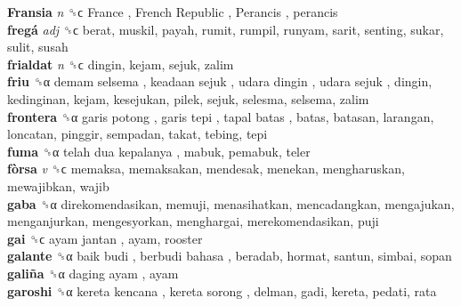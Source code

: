 \textbf{Fransia} \emph{n}  ␝ϲ   France ,  French Republic ,  Perancis , perancis  \\
\textbf{fregá} \emph{adj}  ␝ϲ  berat, muskil, payah, rumit, rumpil, runyam, sarit, senting, sukar, sulit, susah  \\
\textbf{frialdat} \emph{n}  ␝ϲ  dingin, kejam, sejuk, zalim  \\
\textbf{friu} ␝α   demam selsema ,  keadaan sejuk ,  udara dingin ,  udara sejuk , dingin, kedinginan, kejam, kesejukan, pilek, sejuk, selesma, selsema, zalim  \\
\textbf{frontera} ␝α   garis potong ,  garis tepi ,  tapal batas , batas, batasan, larangan, loncatan, pinggir, sempadan, takat, tebing, tepi  \\
\textbf{fuma} ␝α   telah dua kepalanya , mabuk, pemabuk, teler  \\
\textbf{fòrsa} \emph{v}  ␝ϲ  memaksa, memaksakan, mendesak, menekan, mengharuskan, mewajibkan, wajib  \\
\textbf{gaba} ␝α  direkomendasikan, memuji, menasihatkan, mencadangkan, mengajukan, menganjurkan, mengesyorkan, menghargai, merekomendasikan, puji  \\
\textbf{gai} ␝ϲ   ayam jantan , ayam, rooster  \\
\textbf{galante} ␝α   baik budi ,  berbudi bahasa , beradab, hormat, santun, simbai, sopan  \\
\textbf{galiña} ␝α   daging ayam , ayam  \\
\textbf{garoshi} ␝α   kereta kencana ,  kereta sorong , delman, gadi, kereta, pedati, rata  \\
